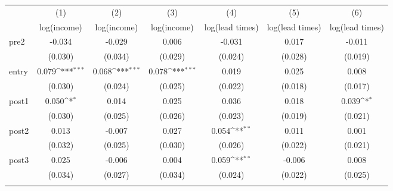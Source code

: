 {
\def\sym#1{\ifmmode^{#1}\else\(^{#1}\)\fi}
\begin{adjustbox}{max width=\textwidth}
\begin{tabular}{l*{6}{c}}
\toprule
            &\multicolumn{1}{c}{(1)}&\multicolumn{1}{c}{(2)}&\multicolumn{1}{c}{(3)}&\multicolumn{1}{c}{(4)}&\multicolumn{1}{c}{(5)}&\multicolumn{1}{c}{(6)}\\
            &\multicolumn{1}{c}{log(income)}&\multicolumn{1}{c}{log(income)}&\multicolumn{1}{c}{log(income)}&\multicolumn{1}{c}{log(lead times)}&\multicolumn{1}{c}{log(lead times)}&\multicolumn{1}{c}{log(lead times)}\\
\midrule
pre2        &      -0.034         &      -0.029         &       0.006         &      -0.031         &       0.017         &      -0.011         \\
            &     (0.030)         &     (0.034)         &     (0.029)         &     (0.024)         &     (0.028)         &     (0.019)         \\
\addlinespace
entry       &       0.079\sym{***}&       0.068\sym{***}&       0.078\sym{***}&       0.019         &       0.025         &       0.008         \\
            &     (0.030)         &     (0.024)         &     (0.025)         &     (0.022)         &     (0.018)         &     (0.017)         \\
\addlinespace
post1       &       0.050\sym{*}  &       0.014         &       0.025         &       0.036         &       0.018         &       0.039\sym{*}  \\
            &     (0.030)         &     (0.025)         &     (0.026)         &     (0.023)         &     (0.019)         &     (0.021)         \\
\addlinespace
post2       &       0.013         &      -0.007         &       0.027         &       0.054\sym{**} &       0.011         &       0.001         \\
            &     (0.032)         &     (0.025)         &     (0.030)         &     (0.026)         &     (0.022)         &     (0.021)         \\
\addlinespace
post3       &       0.025         &      -0.006         &       0.004         &       0.059\sym{**} &      -0.006         &       0.008         \\
            &     (0.034)         &     (0.027)         &     (0.034)         &     (0.024)         &     (0.022)         &     (0.025)         \\
\addlinespace

\end{tabular}
\end{adjustbox}}
